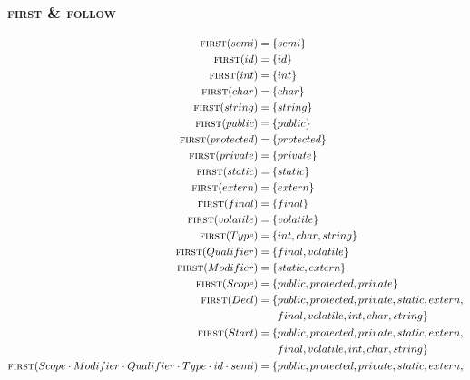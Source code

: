 \documentclass{report}
\newcommand{\Seq}{\cdot}
\newcommand{\FIRST}{\textsc{first}}
\newcommand{\FOLLOW}{\textsc{follow}}
\newcommand{\NT}[1]{{#1}}
\newcommand{\T}[1]{{#1}}
\begin{document}
\subsubsection*{{\FIRST} \& {\FOLLOW}}
\begin{equation*}
  \begin{aligned}
    \FIRST(\T{semi}) &= \{\T{semi}\}\\
    \FIRST(\T{id}) &= \{\T{id}\}\\
    \FIRST(\T{int}) &= \{\T{int}\}\\
    \FIRST(\T{char}) &= \{\T{char}\}\\
    \FIRST(\T{string}) &= \{\T{string}\}\\
    \FIRST(\T{public}) &= \{\T{public}\}\\
    \FIRST(\T{protected}) &= \{\T{protected}\}\\
    \FIRST(\T{private}) &= \{\T{private}\}\\
    \FIRST(\T{static}) &= \{\T{static}\}\\
    \FIRST(\T{extern}) &= \{\T{extern}\}\\
    \FIRST(\T{final}) &= \{\T{final}\}\\
    \FIRST(\T{volatile}) &= \{\T{volatile}\}\\
    \FIRST(\NT{Type}) &= \{\T{int}, \T{char}, \T{string}\} \\
    \FIRST(\NT{Qualifier}) &= \{\T{final}, \T{volatile}\}\\
    \FIRST(\NT{Modifier}) &= \{\T{static}, \T{extern}\}\\
    \FIRST(\NT{Scope}) &= \{\T{public}, \T{protected}, \T{private}\}\\
    \FIRST(\NT{Decl}) &= \begin{aligned}[t]\{&\T{public}, \T{protected}, \T{private}, \T{static}, \T{extern},\\
    &\T{final}, \T{volatile}, \T{int}, \T{char}, \T{string}\}\end{aligned}\\
    \FIRST(\NT{Start}) &= \begin{aligned}[t]\{&\T{public}, \T{protected}, \T{private}, \T{static}, \T{extern},\\
    &\T{final}, \T{volatile}, \T{int}, \T{char}, \T{string}\}\end{aligned}\\
    \FIRST(\NT{Scope} \Seq \NT{Modifier} \Seq \NT{Qualifier} \Seq \NT{Type} \Seq \T{id} \Seq \T{semi}) &= \begin{aligned}[t]\{&\T{public}, \T{protected}, \T{private}, \T{static}, \T{extern},\\

\end{aligned}
\end{aligned}
\end{equation*}
\end{document}
